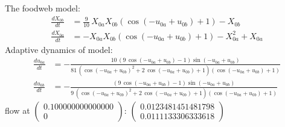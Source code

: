 \documentclass{article}
\begin{document}
The foodweb model:
\[\begin{align*}
\frac{dX_{0b}}{dt} &= \frac{9}{10} \, X_{0a} X_{0b} {\left(\cos\left(-u_{0a} + u_{0b}\right) + 1\right)} - X_{0b}\\
\frac{dX_{0a}}{dt} &= -X_{0a} X_{0b} {\left(\cos\left(-u_{0a} + u_{0b}\right) + 1\right)} - X_{0a}^{2} + X_{0a}
\end{align*}\]
Adaptive dynamics of model:
\begin{align*}
\frac{du_{0a}}{dt} &= -\frac{10 \, {\left(9 \, \cos\left(-u_{0a} + u_{0b}\right) - 1\right)} \sin\left(-u_{0a} + u_{0b}\right)}{81 \, {\left(\cos\left(-u_{0a} + u_{0b}\right)^{2} + 2 \, \cos\left(-u_{0a} + u_{0b}\right) + 1\right)} {\left(\cos\left(-u_{0a} + u_{0b}\right) + 1\right)}}\\
\frac{du_{0b}}{dt} &= -\frac{{\left(9 \, \cos\left(-u_{0a} + u_{0b}\right) - 1\right)} \sin\left(-u_{0a} + u_{0b}\right)}{9 \, {\left(\cos\left(-u_{0a} + u_{0b}\right)^{2} + 2 \, \cos\left(-u_{0a} + u_{0b}\right) + 1\right)} {\left(\cos\left(-u_{0a} + u_{0b}\right) + 1\right)}}
\end{align*}flow at $\left(\begin{array}{c}
  0.100000000000000\\
  0
\end{array}\right)$: $\left(\begin{array}{c}
  0.0123481451481798\\
  0.0111133306333618
\end{array}\right)$
\end{document}
